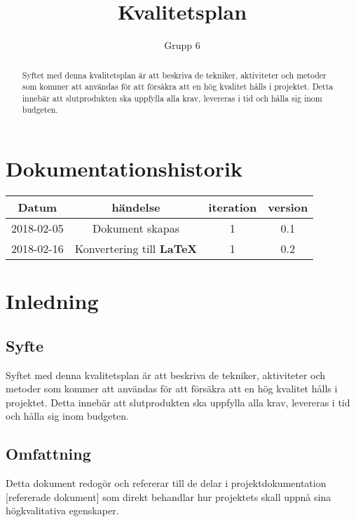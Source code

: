 \documentclass[a4paper,10pt]{article}
\title{Kvalitetsplan}
\author{Grupp 6}
\begin{document}
\begin{titlingpage}
    \maketitle
    \begin{abstract}
    \noindent Syftet med denna kvalitetsplan är att beskriva de tekniker, aktiviteter och metoder som kommer att användas för att försäkra att en hög kvalitet hålls i projektet. Detta innebär att slutprodukten ska uppfylla alla krav, levereras i tid och hålla sig inom budgeten. 
    \end{abstract}

\end{titlingpage}
\tableofcontents
\clearpage
\section{Dokumentationshistorik}
\label{sec:Dokumentation}



\begin{center}
 \begin{tabular}{|c c c c |} 
 \hline
 Datum & händelse & iteration & version\\ 
 \hline
 2018-02-05 & Dokument skapas & 1 &  0.1\\
 \hline
  2018-02-16 & Konvertering till \textbf{\LaTeX} & 1 &  0.2\\
 \hline
\end{tabular}
\end{center}

\section{Inledning}
\vspace{5mm}
\label{sec:Inledning}
\subsection{Syfte}
Syftet med denna kvalitetsplan är att beskriva de tekniker, aktiviteter och metoder som kommer att användas för att försäkra att en hög kvalitet hålls i projektet. Detta innebär att slutprodukten ska uppfylla alla krav, levereras i tid och hålla sig inom budgeten.
\subsection{Omfattning}
Detta dokument redogör och refererar till  de delar i projektdokumentation [refererade dokument] som direkt behandlar hur projektets skall uppnå sina högkvalitativa egenskaper.
\end{document}
